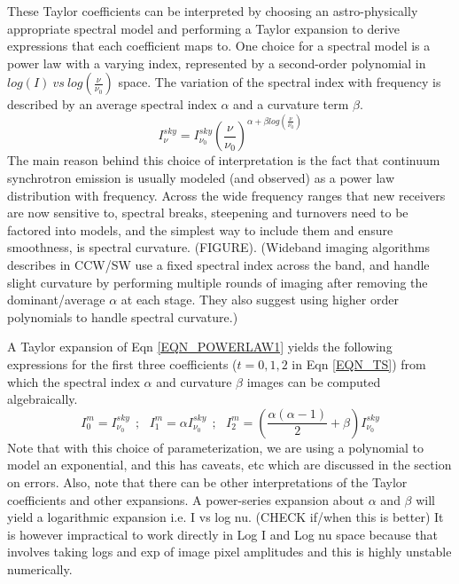 \documentclass[structabstract]{stylefiles/aa}
\newcommand{\nuno}{{\left(\frac{\nu}{\nu_0}\right)}}
\begin{document}
These Taylor coefficients can be interpreted by choosing an astro-physically appropriate
spectral model and performing a Taylor expansion to derive expressions that each coefficient
maps to.
One choice for a spectral model is a power law with a varying index, represented by a 
second-order polynomial in $log(I)~vs~log\nuno$ space.
The variation of the spectral index with frequency is described by an average spectral
index $\alpha$ and a curvature term $\beta$.
\begin{equation}
I_{\nu}^{sky} = I_{\nu_0}^{sky} \nuno^{\alpha + \beta log \nuno}
\label{EQN_POWERLAW1}
\end{equation}
The main reason behind this choice of interpretation is the fact that continuum synchrotron emission is 
usually modeled (and observed) as a power law distribution with frequency. Across the wide
frequency ranges that new receivers are now sensitive to, 
spectral breaks, steepening and turnovers need to be factored into
models, and the simplest way to include them and ensure smoothness, is spectral curvature.
(FIGURE).
(Wideband imaging algorithms describes in CCW/SW use a fixed spectral index across the band,
and handle slight curvature by performing multiple rounds of imaging after removing the 
dominant/average $\alpha$ at each stage. 
They also suggest using higher order polynomials to handle spectral curvature.)

A Taylor expansion of Eqn \ref{EQN_POWERLAW1} yields the following expressions for the first
three coefficients ($t=0,1,2$ in Eqn \ref{EQN_TS}) from which the spectral index $\alpha$ and curvature $\beta$ images 
can be computed algebraically.
\begin{equation}
I^m_0 = I^{sky}_{\nu_0} ~~;~~~ I^m_1 = \alpha I^{sky}_{\nu_0} ~~;~~~ I^m_2 = \left(\frac{\alpha(\alpha-1)}{2} + \beta\right) I^{sky}_{\nu_0}
\label{EQN_COEFFS}
\end{equation}
Note that with this choice of parameterization, 
we are using a polynomial to model an exponential, and this has caveats, etc which
are discussed in the section on errors.
Also, note that there can be other interpretations of the Taylor coefficients %
and other expansions. 
A power-series expansion about $\alpha$ and $\beta$ will yield a logarithmic
expansion i.e. I vs log nu. (CHECK if/when this is better)
It is however impractical to work directly in Log I and Log nu space because that
involves taking logs and exp of image pixel amplitudes and this is highly unstable numerically.
\end{document}
